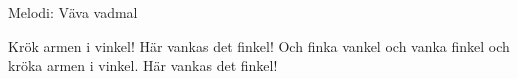 \begin{song}

\begin{songmeta}
Melodi: Väva vadmal
\end{songmeta}

\begin{songtext}
Krök armen i vinkel!
Här vankas det finkel!
Och finka vankel och vanka finkel
och kröka armen i vinkel.
Här vankas det finkel!
\end{songtext}

\begin{songnotes}
\end{songnotes}

\end{song}
